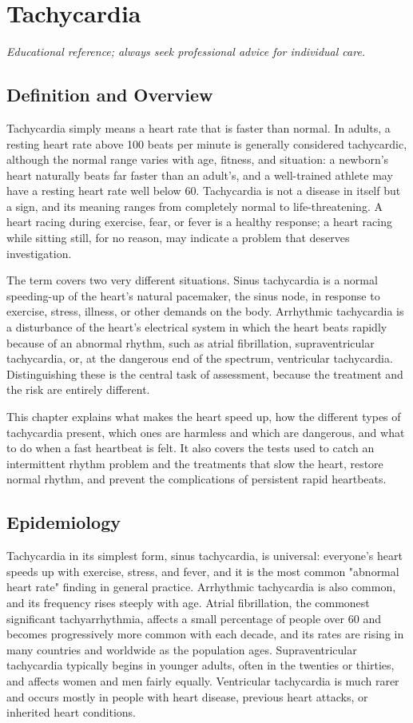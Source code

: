 \chapter{Tachycardia}

\medskip
\noindent\textit{Educational reference; always seek professional advice for individual care.}

\section*{Definition and Overview}
Tachycardia simply means a heart rate that is faster than normal. In adults, a resting heart rate above 100 beats per minute is generally considered tachycardic, although the normal range varies with age, fitness, and situation: a newborn's heart naturally beats far faster than an adult's, and a well-trained athlete may have a resting heart rate well below 60. Tachycardia is not a disease in itself but a sign, and its meaning ranges from completely normal to life-threatening. A heart racing during exercise, fear, or fever is a healthy response; a heart racing while sitting still, for no reason, may indicate a problem that deserves investigation.

The term covers two very different situations. Sinus tachycardia is a normal speeding-up of the heart's natural pacemaker, the sinus node, in response to exercise, stress, illness, or other demands on the body. Arrhythmic tachycardia is a disturbance of the heart's electrical system in which the heart beats rapidly because of an abnormal rhythm, such as atrial fibrillation, supraventricular tachycardia, or, at the dangerous end of the spectrum, ventricular tachycardia. Distinguishing these is the central task of assessment, because the treatment and the risk are entirely different.

This chapter explains what makes the heart speed up, how the different types of tachycardia present, which ones are harmless and which are dangerous, and what to do when a fast heartbeat is felt. It also covers the tests used to catch an intermittent rhythm problem and the treatments that slow the heart, restore normal rhythm, and prevent the complications of persistent rapid heartbeats.

\section*{Epidemiology}
Tachycardia in its simplest form, sinus tachycardia, is universal: everyone's heart speeds up with exercise, stress, and fever, and it is the most common "abnormal heart rate" finding in general practice. Arrhythmic tachycardia is also common, and its frequency rises steeply with age. Atrial fibrillation, the commonest significant tachyarrhythmia, affects a small percentage of people over 60 and becomes progressively more common with each decade, and its rates are rising in many countries and worldwide as the population ages. Supraventricular tachycardia typically begins in younger adults, often in the twenties or thirties, and affects women and men fairly equally. Ventricular tachycardia is much rarer and occurs mostly in people with heart disease, previous heart attacks, or inherited heart conditions.

